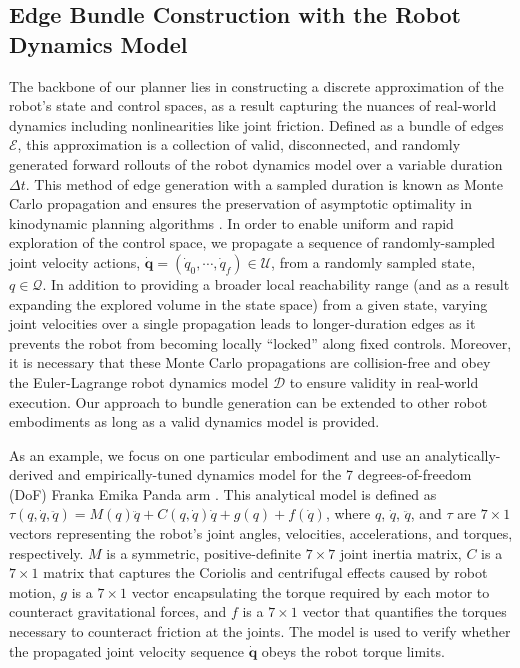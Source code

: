 \subsection{Edge Bundle Construction with the Robot Dynamics Model}\label{sec:methods-eb_construction}

The backbone of our planner lies in constructing a discrete approximation of the robot's state and control spaces, as a result capturing the nuances of real-world dynamics including nonlinearities like joint friction. Defined as a bundle of edges $\mathcal{E}$, this approximation is a collection of valid, disconnected, and randomly generated forward rollouts of the robot dynamics model over a variable duration $\Delta t$. This method of edge generation with a sampled duration is known as Monte Carlo propagation and ensures the preservation of asymptotic optimality in kinodynamic planning algorithms \cite{kunz2015kinodynamic}.
In order to enable uniform and rapid exploration of the control space, we propagate a sequence of randomly-sampled joint velocity actions, $\boldsymbol{\dot{q}} = (\dot{q}_0, \cdots, \dot{q}_f) \in \mathcal{U}$, from a randomly sampled state, $q \in \mathcal{Q}$. In addition to providing a broader local reachability range (and as a result expanding the explored volume in the state space) from a given state, varying joint velocities over a single propagation leads to longer-duration edges as it prevents the robot from becoming locally ``locked'' along fixed controls.
Moreover, it is necessary that these Monte Carlo propagations are collision-free and obey the Euler-Lagrange robot dynamics model $\mathcal{D}$ to ensure validity in real-world execution. Our approach to bundle generation can be extended to other robot embodiments as long as a valid dynamics model is provided.

As an example, we focus on one particular embodiment and use an analytically-derived and empirically-tuned dynamics model for the 7 degrees-of-freedom (DoF) Franka Emika Panda arm \cite{Gaz2019}. This analytical model is defined as
$\tau(q, \dot{q}, \ddot{q}) = M(q)\ddot{q} + C(q, \dot{q})\dot{q} + g(q) + f(\dot{q})$,
where $q$, $\dot{q}$, $\ddot{q}$, and $\tau$ are $7\times1$ vectors representing the robot's joint angles, velocities, accelerations, and torques, respectively. $M$ is a symmetric, positive-definite $7\times7$ joint inertia matrix, $C$ is a $7\times1$ matrix that captures the Coriolis and centrifugal effects caused by robot motion, $g$ is a $7\times1$ vector encapsulating the torque required by each motor to counteract gravitational forces, and $f$ is a $7\times1$ vector that quantifies the torques necessary to counteract friction at the joints. The model is used to verify whether the propagated joint velocity sequence $\boldsymbol{\dot{q}}$ obeys the robot torque limits.

